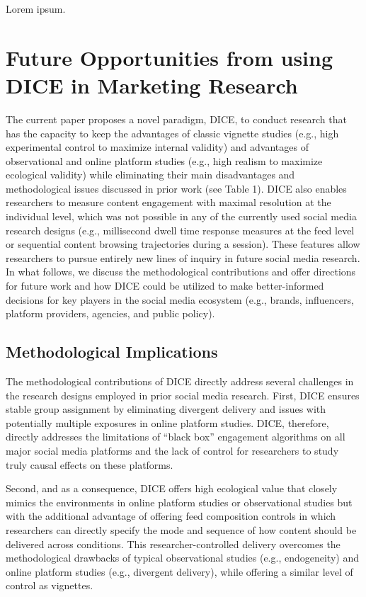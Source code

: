 \documentclass[
  a4paper,
]{scrreprt}
\begin{document}
Lorem ipsum.

\hypertarget{future-opportunities-from-using-dice-in-marketing-research}{%
\section{Future Opportunities from using DICE in Marketing
Research}\label{future-opportunities-from-using-dice-in-marketing-research}}

The current paper proposes a novel paradigm, DICE, to conduct research
that has the capacity to keep the advantages of classic vignette studies
(e.g., high experimental control to maximize internal validity) and
advantages of observational and online platform studies (e.g., high
realism to maximize ecological validity) while eliminating their main
disadvantages and methodological issues discussed in prior work (see
Table 1). DICE also enables researchers to measure content engagement
with maximal resolution at the individual level, which was not possible
in any of the currently used social media research designs (e.g.,
millisecond dwell time response measures at the feed level or sequential
content browsing trajectories during a session). These features allow
researchers to pursue entirely new lines of inquiry in future social
media research. In what follows, we discuss the methodological
contributions and offer directions for future work and how DICE could be
utilized to make better-informed decisions for key players in the social
media ecosystem (e.g., brands, influencers, platform providers,
agencies, and public policy).

\hypertarget{methodological-implications}{%
\subsection{Methodological
Implications}\label{methodological-implications}}

The methodological contributions of DICE directly address several
challenges in the research designs employed in prior social media
research. First, DICE ensures stable group assignment by eliminating
divergent delivery and issues with potentially multiple exposures in
online platform studies. DICE, therefore, directly addresses the
limitations of ``black box'' engagement algorithms on all major social
media platforms and the lack of control for researchers to study truly
causal effects on these platforms.

Second, and as a consequence, DICE offers high ecological value that
closely mimics the environments in online platform studies or
observational studies but with the additional advantage of offering feed
composition controls in which researchers can directly specify the mode
and sequence of how content should be delivered across conditions. This
researcher-controlled delivery overcomes the methodological drawbacks of
typical observational studies (e.g., endogeneity) and online platform
studies (e.g., divergent delivery), while offering a similar level of
control as vignettes.
\end{document}

